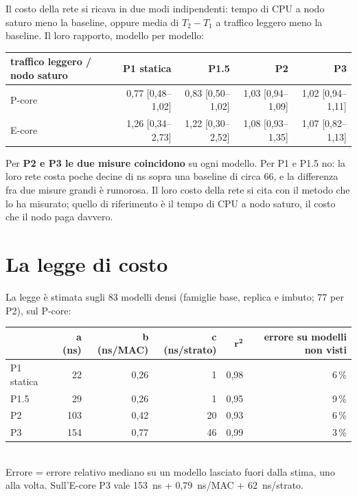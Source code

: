 \documentclass[11pt,a4paper,oneside]{report}
\begin{document}
Il costo della rete si ricava in due modi indipendenti: tempo di CPU a nodo
saturo meno la baseline, oppure media di $T_2-T_1$ a traffico leggero meno la
baseline. Il loro rapporto, modello per modello:

\begin{center}
\small
\begin{tabular}{@{}lrrrr@{}}
\toprule
\textbf{traffico leggero / nodo saturo} & \textbf{P1 statica} & \textbf{P1.5} & \textbf{P2} & \textbf{P3} \\
\midrule
P-core & 0,77 [0,48--1,02] & 0,83 [0,50--1,02] & 1,03 [0,94--1,09] & 1,02 [0,94--1,11] \\
E-core & 1,26 [0,34--2,73] & 1,22 [0,30--2,52] & 1,08 [0,93--1,35] & 1,07 [0,82--1,13] \\
\bottomrule
\end{tabular}
\end{center}

Per \textbf{P2 e P3 le due misure coincidono} su ogni modello. Per P1 e P1.5 no:
la loro rete costa poche decine di ns sopra una baseline di circa 66, e la
differenza fra due misure grandi è rumorosa. Il loro costo della rete si cita
con il metodo che lo ha misurato; quello di riferimento è il tempo di CPU a nodo
saturo, il costo che il nodo paga davvero.

\section{La legge di costo}

La legge è stimata sugli 83 modelli densi (famiglie base, replica e imbuto; 77
per P2), sul P-core:

\begin{center}
\small
\begin{tabular}{@{}lrrrrr@{}}
\toprule
& \textbf{a (ns)} & \textbf{b (ns/MAC)} & \textbf{c (ns/strato)} & $\boldsymbol{r^2}$ & \textbf{errore su modelli non visti} \\
\midrule
P1 statica & 22  & 0,26 & 1  & 0,98 & 6\,\% \\
P1.5       & 29  & 0,26 & 1  & 0,95 & 9\,\% \\
P2         & 103 & 0,42 & 20 & 0,93 & 6\,\% \\
P3         & 154 & 0,77 & 46 & 0,99 & 3\,\% \\
\bottomrule
\end{tabular}\\[2pt]
{\footnotesize\color{soft} Errore = errore relativo mediano su un modello lasciato fuori
dalla stima, uno alla volta. Sull'E-core P3 vale 153~ns + 0,79~ns/MAC + 62~ns/strato.}
\end{center}
\end{document}
